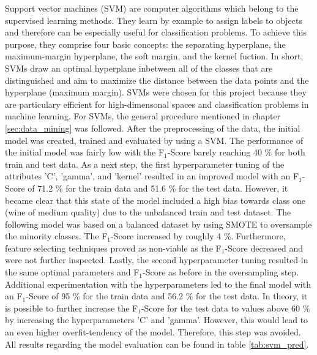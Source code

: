 Support vector machines (SVM) are computer algorithms which belong to the supervised learning methods. They learn by example to assign labels to objects and therefore can be especially useful for classification problems. To achieve this purpose, they comprise four basic concepts: the separating hyperplane, the maximum-margin hyperplane, the soft margin, and the kernel fuction. In short, SVMs draw an optimal hyperplane inbetween all of the classes that are distinguished and aim to maximize the distance between the data points and the hyperplane (maximum margin). \citep{Noble2006}
SVMs were chosen for this project because they are particulary efficient for high-dimensonal spaces and classification problems in machine learning. \citep{ScikitLearn2021}
For SVMs, the general procedure mentioned in chapter \ref{sec:data_mining} was followed. After the preprocessing of the data, the initial model was created, trained and evaluated by using a SVM. The performance of the initial model was fairly low with the F$_1$-Score barely reaching 40 \% for both train and test data. As a next step, the first hyperparameter tuning of the attributes 'C', 'gamma', and 'kernel' resulted in an improved model with an F$_1$-Score of 71.2 \% for the train data and 51.6 \% for the test data. However, it became clear that this state of the model included a high bias towards class one (wine of medium quality) due to the unbalanced train and test dataset. 
The following model was based on a balanced dataset by using SMOTE to oversample the minority classes. The F$_1$-Score increased by roughly 4 \%. %
Furthermore, feature selecting techniques proved as non-viable as the F$_1$-Score decreased and were not further inspected. %
Lastly, the second hyperparameter tuning resulted in the same optimal parameters and F$_1$-Score as before in the oversampling step. Additional experimentation with the hyperparameters led to the final model with an F$_1$-Score of 95 \% for the train data and 56.2 \% for the test data. In theory, it is possible to further increase the F$_1$-Score for the test data to values above 60 \% by increasing the hyperparameters 'C' and 'gamma'. However, this would lead to an even higher overfit-tendency of the model. Therefore, this step was avoided. All results regarding the model evaluation can be found in table \ref{tab:svm_pred}.



